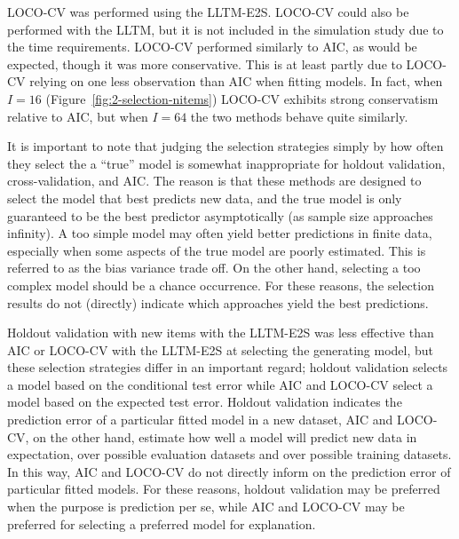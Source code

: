 LOCO-CV was performed using the LLTM-E2S. LOCO-CV could also be performed with the LLTM, but it is not included in the simulation study due to the time requirements. LOCO-CV performed similarly to AIC, as would be expected, though it was more conservative. This is at least partly due to LOCO-CV relying on one less observation than AIC when fitting models. In fact, when $I = 16$ (Figure~\ref{fig:2-selection-nitems}) LOCO-CV exhibits strong conservatism relative to AIC, but when $I=64$ the two methods behave quite similarly.

It is important to note that judging the selection strategies simply by how often they select the a ``true'' model is somewhat inappropriate for holdout validation, cross-validation, and AIC. The reason is that these methods are designed to select the model that best predicts new data, and the true model is only guaranteed to be the best predictor asymptotically (as sample size approaches infinity). A too simple model may often yield better predictions in finite data, especially when some aspects of the true model are poorly estimated. This is referred to as the bias variance trade off. On the other hand, selecting a too complex model should be a chance occurrence. For these reasons, the selection results do not (directly) indicate which approaches yield the best predictions. 

Holdout validation with new items with the LLTM-E2S was less effective than AIC or LOCO-CV with the LLTM-E2S at selecting the generating model, but these selection strategies differ in an important regard; holdout validation selects a model based on the conditional test error while AIC and LOCO-CV select a model based on the expected test error. Holdout validation indicates the prediction error of a particular fitted model in a new dataset, 
AIC and LOCO-CV, on the other hand, estimate how well a model will predict new data in expectation, over possible evaluation datasets and over possible training datasets. In this way, AIC and LOCO-CV do not directly inform on the prediction error of particular fitted models. For these reasons, holdout validation may be preferred when the purpose is prediction per se, while AIC and LOCO-CV may be preferred for selecting a preferred model for explanation.

